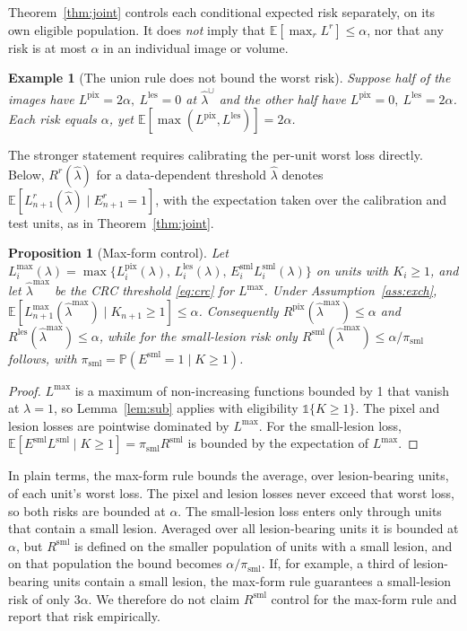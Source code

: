 \documentclass[sn-mathphys-num]{sn-jnl}%
\theoremstyle{thmstyleone}
\newtheorem{proposition}{Proposition}
\theoremstyle{thmstyletwo}
\newtheorem{example}{Example}
\theoremstyle{thmstylethree}
\newcommand{\E}{\mathbb{E}}
\newcommand{\Prob}{\mathbb{P}}
\newcommand{\1}{\mathbb{1}}
\newcommand{\lhat}{\hat\lambda}
\newcommand{\pix}{\mathrm{pix}}
\newcommand{\les}{\mathrm{les}}
\newcommand{\sml}{\mathrm{sml}}
\begin{document}
Theorem~\ref{thm:joint} controls each conditional expected risk separately, on its own eligible population. It does \emph{not} imply that $\E[\max_r L^r]\le\alpha$, nor that any risk is at most $\alpha$ in an individual image or volume.

\begin{example}[The union rule does not bound the worst risk]\label{ex:union}
Suppose half of the images have $L^{\pix}=2\alpha,\ L^{\les}=0$ at $\lhat^\cup$ and the other half have $L^{\pix}=0,\ L^{\les}=2\alpha$. Each risk equals $\alpha$, yet $\E[\max(L^{\pix},L^{\les})]=2\alpha$.
\end{example}

The stronger statement requires calibrating the per-unit worst loss directly. Below, $R^r(\hat\lambda)$ for a data-dependent threshold $\hat\lambda$ denotes $\E[L^r_{n+1}(\hat\lambda)\mid E^r_{n+1}=1]$, with the expectation taken over the calibration and test units, as in Theorem~\ref{thm:joint}.

\begin{proposition}[Max-form control]\label{prop:max}
Let $L_i^{\max}(\lambda)=\max\{L_i^{\pix}(\lambda),\,L_i^{\les}(\lambda),\,E^{\sml}_iL_i^{\sml}(\lambda)\}$ on units with $K_i\ge1$, and let $\lhat^{\max}$ be the CRC threshold \eqref{eq:crc} for $L^{\max}$. Under Assumption~\ref{ass:exch}, $\E[L^{\max}_{n+1}(\lhat^{\max})\mid K_{n+1}\ge1]\le\alpha$. Consequently $R^{\pix}(\lhat^{\max})\le\alpha$ and $R^{\les}(\lhat^{\max})\le\alpha$, while for the small-lesion risk only $R^{\sml}(\lhat^{\max})\le\alpha/\pi_{\sml}$ follows, with $\pi_{\sml}=\Prob(E^{\sml}=1\mid K\ge1)$.
\end{proposition}
\begin{proof}
$L^{\max}$ is a maximum of non-increasing functions bounded by 1 that vanish at $\lambda=1$, so Lemma~\ref{lem:sub} applies with eligibility $\1\{K\ge1\}$. The pixel and lesion losses are pointwise dominated by $L^{\max}$. For the small-lesion loss, $\E[E^{\sml}L^{\sml}\mid K\ge1]=\pi_{\sml}R^{\sml}$ is bounded by the expectation of $L^{\max}$.
\end{proof}

In plain terms, the max-form rule bounds the average, over lesion-bearing units, of each unit's worst loss. The pixel and lesion losses never exceed that worst loss, so both risks are bounded at $\alpha$. The small-lesion loss enters only through units that contain a small lesion. Averaged over all lesion-bearing units it is bounded at $\alpha$, but $R^{\sml}$ is defined on the smaller population of units with a small lesion, and on that population the bound becomes $\alpha/\pi_{\sml}$. If, for example, a third of lesion-bearing units contain a small lesion, the max-form rule guarantees a small-lesion risk of only $3\alpha$. We therefore do not claim $R^{\sml}$ control for the max-form rule and report that risk empirically.
\end{document}
